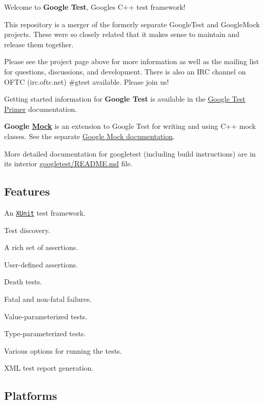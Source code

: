 \href{https://travis-ci.org/google/googletest}{\tt } \href{https://ci.appveyor.com/project/BillyDonahue/googletest/branch/master}{\tt }

Welcome to {\bfseries Google Test}, Google\textquotesingle{}s C++ test framework!

This repository is a merger of the formerly separate Google\+Test and Google\+Mock projects. These were so closely related that it makes sense to maintain and release them together.

Please see the project page above for more information as well as the mailing list for questions, discussions, and development. There is also an I\+RC channel on O\+F\+TC (irc.\+oftc.\+net) \#gtest available. Please join us!

Getting started information for {\bfseries Google Test} is available in the \hyperlink{Primer_8md}{Google Test Primer} documentation.

{\bfseries Google \hyperlink{classMock}{Mock}} is an extension to Google Test for writing and using C++ mock classes. See the separate \hyperlink{vendor_2googletest_2googlemock_2README_8md}{Google Mock documentation}.

More detailed documentation for googletest (including build instructions) are in its interior \hyperlink{vendor_2googletest_2README_8md}{googletest/\+R\+E\+A\+D\+ME.md} file.

\subsection*{Features}


\begin{DoxyItemize}
\item An \href{https://en.wikipedia.org/wiki/XUnit}{\tt X\+Unit} test framework.
\item Test discovery.
\item A rich set of assertions.
\item User-\/defined assertions.
\item Death tests.
\item Fatal and non-\/fatal failures.
\item Value-\/parameterized tests.
\item Type-\/parameterized tests.
\item Various options for running the tests.
\item X\+ML test report generation.
\end{DoxyItemize}

\subsection*{Platforms}

